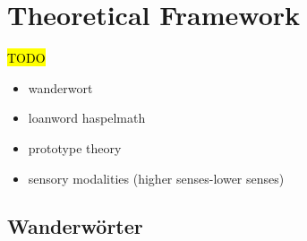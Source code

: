 

% 


\section{Theoretical Framework}

\hl{TODO}

\begin{itemize}
\item wanderwort
\item loanword haspelmath
\item prototype theory
\item sensory modalities (higher senses-lower senses)
\end{itemize}

\subsection{Wanderwörter}


